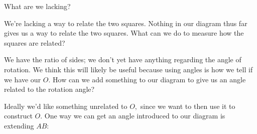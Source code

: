 What are we lacking?



We're lacking a way to relate the two squares. Nothing in our diagram thus far gives us a way to relate the two squares. What can we do to measure how the squares are related?


We have the ratio of sides; we don't yet have anything regarding the angle of rotation. We think this will likely be useful because using angles is how we tell if we have our $O.$ How can we add something to our diagram to give us an angle related to the rotation angle?

Ideally we'd like something unrelated to $O,$ since we want to then use it to construct $O.$ One way we can get an angle introduced to our diagram is extending $AB:$




